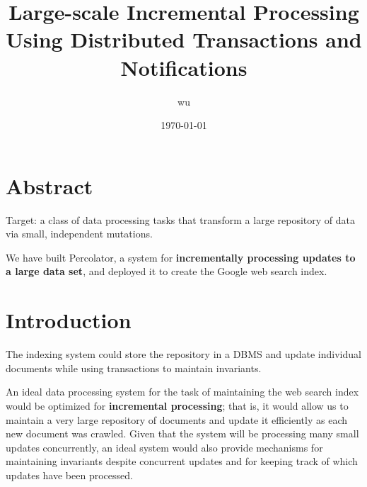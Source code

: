 \documentclass[11pt]{article}
\author{wu}
\date{\today}
\title{Large-scale Incremental Processing Using Distributed Transactions and Notifications}
\begin{document}
\maketitle
\section{Abstract}
\label{sec:org90454ea}
Target: a class of data processing tasks that transform a large repository of data via small,
independent mutations.

We have built Percolator, a system for \textbf{incrementally processing updates to a large data set}, and
deployed it to create the Google web search index.
\section{Introduction}
\label{sec:orgc28287e}
The indexing system could store the repository in a DBMS and update individual documents while using
transactions to maintain invariants.

An ideal data processing system for the task of maintaining the web search index would be optimized
for \textbf{incremental processing}; that is, it would allow us to maintain a very large repository of
documents and update it efficiently as each new document was crawled. Given that the system will be
processing many small updates concurrently, an ideal system would also provide mechanisms for
maintaining invariants despite concurrent updates and for keeping track of which updates have been
processed.
\end{document}

